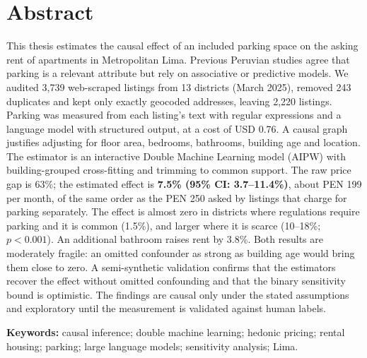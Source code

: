 \documentclass[12pt,a4paper,oneside]{report}
\begin{document}
\chapter*{Abstract}
This thesis estimates the causal effect of an included parking space on the asking rent of apartments in Metropolitan Lima. Previous Peruvian studies agree that parking is a relevant attribute but rely on associative or predictive models. We audited 3,739 web-scraped listings from 13 districts (March 2025), removed 243 duplicates and kept only exactly geocoded addresses, leaving 2,220 listings. Parking was measured from each listing's text with regular expressions and a language model with structured output, at a cost of USD 0.76. A causal graph justifies adjusting for floor area, bedrooms, bathrooms, building age and location. The estimator is an interactive Double Machine Learning model (AIPW) with building-grouped cross-fitting and trimming to common support. The raw price gap is 63\%; the estimated effect is \textbf{7.5\% (95\% CI: 3.7--11.4\%)}, about PEN 199 per month, of the same order as the PEN 250 asked by listings that charge for parking separately. The effect is almost zero in districts where regulations require parking and it is common (1.5\%), and larger where it is scarce (10--18\%; $p<0.001$). An additional bathroom raises rent by 3.8\%. Both results are moderately fragile: an omitted confounder as strong as building age would bring them close to zero. A semi-synthetic validation confirms that the estimators recover the effect without omitted confounding and that the binary sensitivity bound is optimistic. The findings are causal only under the stated assumptions and exploratory until the measurement is validated against human labels.

\noindent\textbf{Keywords:} causal inference; double machine learning; hedonic pricing; rental housing; parking; large language models; sensitivity analysis; Lima.

\tableofcontents

\clearpage
{}










{\small}

\appendix

\end{document}
